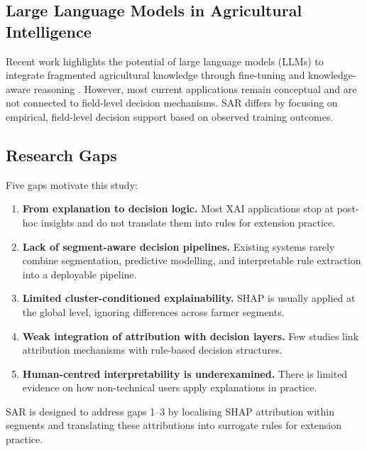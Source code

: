 \documentclass[3p,twocolumn,authoryear]{elsarticle}
\begin{document}
\subsection{Large Language Models in Agricultural Intelligence}

Recent work highlights the potential of large language models (LLMs) to
integrate fragmented agricultural knowledge through fine-tuning and
knowledge-aware reasoning \citep{li2025llm}. However, most current applications
remain conceptual and are not connected to field-level decision mechanisms. SAR
differs by focusing on empirical, field-level decision support based on observed
training outcomes.

\subsection{Research Gaps}

Five gaps motivate this study:

\begin{enumerate}
  \item \textbf{From explanation to decision logic.} Most XAI applications stop
  at post-hoc insights and do not translate them into rules for extension
  practice.

  \item \textbf{Lack of segment-aware decision pipelines.} Existing systems
  rarely combine segmentation, predictive modelling, and interpretable rule
  extraction into a deployable pipeline.

  \item \textbf{Limited cluster-conditioned explainability.} SHAP is usually
  applied at the global level, ignoring differences across farmer segments.

  \item \textbf{Weak integration of attribution with decision layers.} Few
  studies link attribution mechanisms with rule-based decision structures.

  \item \textbf{Human-centred interpretability is underexamined.} There is
  limited evidence on how non-technical users apply explanations in practice.
\end{enumerate}

SAR is designed to address gaps 1--3 by localising SHAP attribution within
segments and translating these attributions into surrogate rules for extension
practice.

\end{document}
